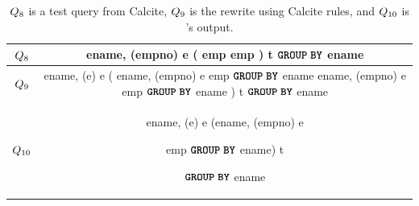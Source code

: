 \begin{table}[!t]
\footnotesize
\caption{$Q_8$ is a test query from Calcite, 
$Q_9$ is the rewrite using Calcite rules, and
$Q_{10}$ is \slabcity's output.}
\vspace{-8pt}
\begin{tabular}{|c|c|}

 \hline
 $Q_8$

 & 
\makecell[l]{\sqlselectcolor ename, \sqlmincolor (empno) \sqlascolor e \sqlfromcolor (\\
             \hspace{1em} \sqlselectcolor * \sqlfromcolor emp \\
             \hspace{1em} \sqlunionallcolor\\
             \hspace{1em} \sqlselectcolor * \sqlfromcolor emp\\
              ) \sqlascolor t ${\color{black}{{\textbf{\texttt{GROUP}}\;\textbf{\texttt{BY}}}}}$ ename
              } 
 
  
\\

 \hline
 $Q_9$

 & 
\makecell[l]{\sqlselectcolor ename, \sqlmincolor (e) \sqlascolor e \sqlfromcolor (\\
             \hspace{1em} \sqlselectcolor ename, \sqlmincolor (empno) \sqlascolor e \sqlfromcolor emp ${\color{black}{{\textbf{\texttt{GROUP}}\;\textbf{\texttt{BY}}}}}$ ename\\
             \hspace{1em} \sqlunionallcolor\\
             \hspace{1em} \sqlselectcolor ename, \sqlmincolor (empno) \sqlascolor e \sqlfromcolor emp ${\color{black}{{\textbf{\texttt{GROUP}}\;\textbf{\texttt{BY}}}}}$ ename\\
              ) \sqlascolor t ${\color{black}{{\textbf{\texttt{GROUP}}\;\textbf{\texttt{BY}}}}}$ ename
              } 
 
  
\\

\hline

 $Q_{10}$

&
\makecell[l]{\sqlselectcolor ename, \sqlmincolor (e) \sqlascolor e \\ \sqlfromcolor (\sqlselectcolor ename, \sqlmincolor (empno) \sqlascolor e
             \\ 
             \hspace{2.4em} \sqlfromcolor emp 
             \\ \hspace{2.4em} ${\color{black}{{\textbf{\texttt{GROUP}}\;\textbf{\texttt{BY}}}}}$ ename) \sqlascolor t
             \\
             ${\color{black}{{\textbf{\texttt{GROUP}}\;\textbf{\texttt{BY}}}}}$ ename
              } 
  
 
 \\
 \hline
\end{tabular}
\vspace{-15pt}


\label{slab:tab:Q8-Q10} 
\end{table}




